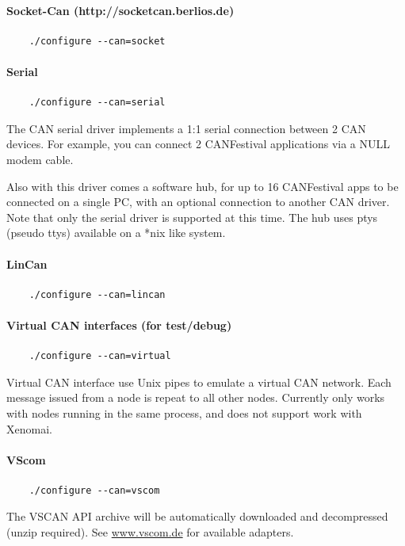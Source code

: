 \documentclass[12pt,english,a4paper]{book}
\begin{document}
\paragraph{Socket-Can (http://socketcan.berlios.de)}
\begin{verbatim}
	./configure --can=socket
\end{verbatim}

\paragraph{Serial}
\begin{verbatim}
	./configure --can=serial
\end{verbatim}
The CAN serial driver implements a 1:1 serial connection between 2 CAN devices.
For example, you can connect 2 CANFestival applications via a NULL modem cable.

Also with this driver comes a software hub, for up to 16 CANFestival apps to 
be connected on a single PC, with an optional connection to another CAN driver.
Note that only the serial driver is supported at this time.  The hub uses ptys 
(pseudo ttys) available on a *nix like system.

\paragraph{LinCan}
\begin{verbatim}
	./configure --can=lincan
\end{verbatim}

\paragraph{Virtual CAN interfaces (for test/debug)}
\begin{verbatim}
	./configure --can=virtual
\end{verbatim}
Virtual CAN interface use Unix pipes to emulate a virtual CAN network.
Each message issued from a node is repeat to all other nodes. Currently
only works with nodes running in the same process, and does not support
work with Xenomai.

\paragraph{VScom}
\begin{verbatim}
	./configure --can=vscom
\end{verbatim}
The VSCAN API archive will be automatically downloaded and decompressed (unzip required). See \href{http://www.vscom.de/1_1_05.htm}{www.vscom.de} for available adapters.
\end{document}
